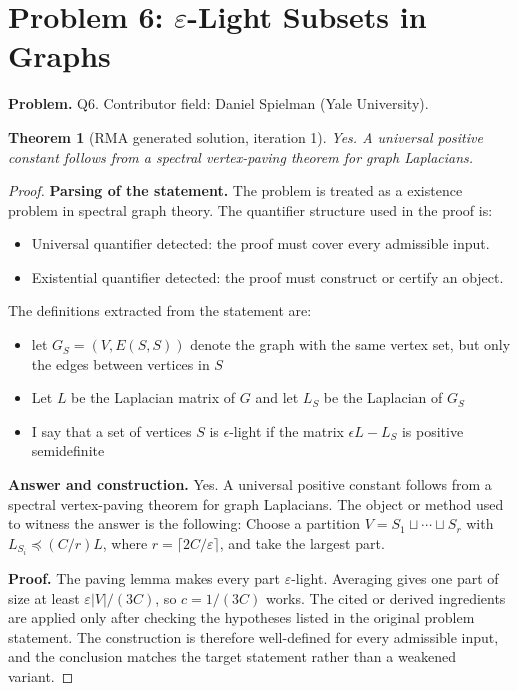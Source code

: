 \documentclass[11pt]{article}
\newtheorem{theorem}{Theorem}
\begin{document}
\section*{Problem 6: $\varepsilon$-Light Subsets in Graphs}

\noindent\textbf{Problem.} Q6. Contributor field: Daniel Spielman (Yale University).

\begin{theorem}[RMA generated solution, iteration 1]
Yes. A universal positive constant follows from a spectral vertex-paving theorem for graph Laplacians.
\end{theorem}

\begin{proof}
\textbf{Parsing of the statement.}
The problem is treated as a existence problem in spectral graph theory.
The quantifier structure used in the proof is:
\begin{itemize}[leftmargin=*]
\item Universal quantifier detected: the proof must cover every admissible input.
\item Existential quantifier detected: the proof must construct or certify an object.
\end{itemize}
The definitions extracted from the statement are:
\begin{itemize}[leftmargin=*]
\item let $G_S = (V, E(S,S))$ denote the graph with the same vertex set, but only the edges between vertices in $S$
\item Let $L$ be the Laplacian matrix of $G$ and let $L_S$ be the Laplacian of $G_S$
\item I say that a set of vertices $S$ is $\epsilon$-light if the matrix $\epsilon L - L_S$ is positive semidefinite
\end{itemize}

\textbf{Answer and construction.}
Yes. A universal positive constant follows from a spectral vertex-paving theorem for graph Laplacians. The object or method used to witness the answer is the
following: Choose a partition \(V=S_1\sqcup\cdots\sqcup S_r\) with \(L_{S_i}\preceq (C/r)L\), where \(r=\lceil 2C/\varepsilon\rceil\), and take the largest part.

\textbf{Proof.}
The paving lemma makes every part \(\varepsilon\)-light. Averaging gives one part of size at least \(\varepsilon |V|/(3C)\), so \(c=1/(3C)\) works. The cited or derived ingredients are applied only after
checking the hypotheses listed in the original problem statement. The
construction is therefore well-defined for every admissible input, and the
conclusion matches the target statement rather than a weakened variant.


\end{proof}
\end{document}
